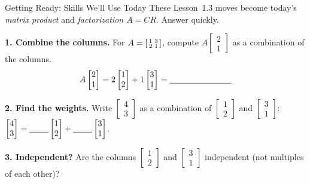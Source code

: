 \documentclass[10pt]{article}
\begin{document}

\vspace{0.12in}

\begin{notesbox}{Getting Ready: Skills We'll Use Today}
\small These Lesson~1.3 moves become today's \emph{matrix product} and \emph{factorization $A=CR$}.
Answer quickly.

\vspace{4pt}
\textbf{1. Combine the columns.} For $A=\begin{bsmallmatrix} 1 & 3 \\ 2 & 1 \end{bsmallmatrix}$,
compute $A\begin{bmatrix} 2 \\ 1 \end{bmatrix}$ as a combination of the columns.
\[
  A\begin{bmatrix} 2 \\ 1 \end{bmatrix}
  = 2\begin{bmatrix} 1 \\ 2 \end{bmatrix} + 1\begin{bmatrix} 3 \\ 1 \end{bmatrix}
  = \blank{2.6cm}
\]

\vspace{4pt}
\textbf{2. Find the weights.} Write $\begin{bmatrix} 4 \\ 3 \end{bmatrix}$ as a combination of
$\begin{bmatrix} 1 \\ 2 \end{bmatrix}$ and $\begin{bmatrix} 3 \\ 1 \end{bmatrix}$:
$\begin{bmatrix} 4 \\ 3 \end{bmatrix}=\blank{0.8cm}\begin{bmatrix} 1 \\ 2 \end{bmatrix}
+\blank{0.8cm}\begin{bmatrix} 3 \\ 1 \end{bmatrix}$. \writeline

\vspace{6pt}
\textbf{3. Independent?} Are the columns $\begin{bmatrix} 1 \\ 2 \end{bmatrix}$ and
$\begin{bmatrix} 3 \\ 1 \end{bmatrix}$ independent (not multiples of each other)? \writeline
\end{notesbox}
\end{document}
